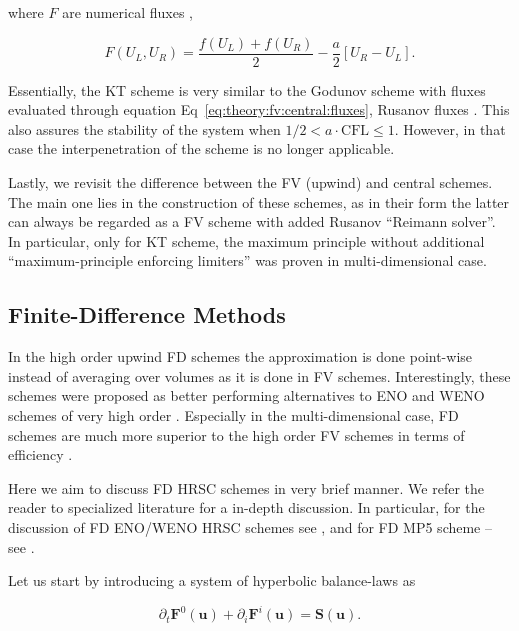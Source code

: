where $F$ are numerical fluxes \ie,

\begin{equation}
F(U_L, U_R) = \frac{f(U_L) + f(U_R)}{2} - \frac{a}{2}[U_R - U_L].
\label{eq:theory:fv:central:fluxes}
\end{equation}

Essentially, the \ac{KT} scheme is very similar to the Godunov scheme with fluxes evaluated through equation Eq~\eqref{eq:theory:fv:central:fluxes}, Rusanov fluxes \citep{Kurganov:2000}. This also assures the stability of the system when $1/2 < a \cdot \text{CFL} \leq 1$. However, in that case the interpenetration of the scheme is no longer applicable. 

Lastly, we revisit the difference between the \ac{FV} (upwind) and central schemes. The main one lies in the construction of these schemes, as in their form the latter can always be regarded as a \ac{FV} scheme with added Rusanov ``Reimann solver''. In particular, only for \ac{KT} scheme, the maximum principle without additional ``maximum-principle enforcing limiters'' was proven in multi-dimensional case. 



\subsection{Finite-Difference Methods}

In the high order upwind \ac{FD} schemes the approximation is done point-wise instead of averaging over volumes as it is done in \ac{FV} schemes. Interestingly, these schemes were proposed as better performing alternatives to \ac{ENO} and \ac{WENO} schemes of very high order \citep{Shu:1988,Shu:1989,Jiang:1996}. 
Especially in the multi-dimensional case, \ac{FD} schemes are much more superior to the high order \ac{FV} schemes in terms of efficiency \citep{Shu:1999,Shu:2003}. 

Here we aim to discuss \ac{FD} \ac{HRSC} schemes in very brief manner. We refer the reader to specialized literature for a in-depth discussion. In particular, for the discussion of \ac{FD} \ac{ENO}/\ac{WENO} \ac{HRSC} schemes see \citep{Shu:1999}, and for \ac{FD} \ac{MP5} scheme -- see \citep{Mignone:2010}. 

Let us start by introducing a system of hyperbolic balance-laws as

\begin{equation}
\partial_t\boldsymbol{F}^0(\boldsymbol{u}) + \partial_i\boldsymbol{F}^i(\boldsymbol{u}) = \boldsymbol{S}(\boldsymbol{u}).
\label{eq:theory:fd:hypsys}
\end{equation}

